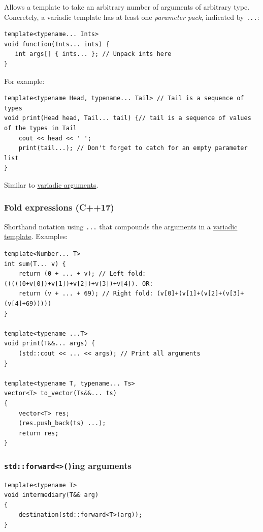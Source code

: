 \documentclass[table, xcdraw]{article}%
\begin{document}
Allows a template to take an arbitrary number of arguments of arbitrary type. Concretely, a variadic template has at least one \emph{parameter pack}, indicated by \texttt{...}:

\begin{verbatim}
template<typename... Ints>
void function(Ints... ints) {
   int args[] { ints... }; // Unpack ints here
}
\end{verbatim}

For example:

\begin{verbatim}
template<typename Head, typename... Tail> // Tail is a sequence of types
void print(Head head, Tail... tail) {// tail is a sequence of values of the types in Tail
    cout << head << ' ';
    print(tail...); // Don't forget to catch for an empty parameter list
}
\end{verbatim}

Similar to \hyperref[variadicarguments]{variadic arguments}.

\subsubsection{Fold expressions (C++17)}

Shorthand notation using \texttt{...} that compounds the arguments in a \hyperref[variadictemplates]{variadic template}. Examples:

\begin{verbatim}
template<Number... T>
int sum(T... v) {
    return (0 + ... + v); // Left fold: (((((0+v[0])+v[1])+v[2])+v[3])+v[4]). OR:
    return (v + ... + 69); // Right fold: (v[0]+(v[1]+(v[2]+(v[3]+(v[4]+69)))))
}

template<typename ...T>
void print(T&&... args) {
    (std::cout << ... << args); // Print all arguments
}

template<typename T, typename... Ts>
vector<T> to_vector(Ts&&... ts)
{
    vector<T> res;
    (res.push_back(ts) ...);
    return res;
}
\end{verbatim}

\subsubsection{\texttt{std::forward<>()}ing arguments}

\begin{verbatim}
template<typename T>
void intermediary(T&& arg) 
{
    destination(std::forward<T>(arg));
}
\end{verbatim}
\end{document}
